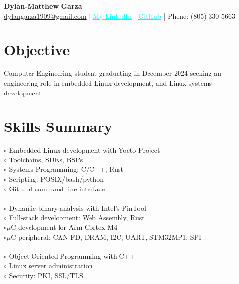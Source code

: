 \documentclass[letter,12pt]{article}
\begin{document}
\begin{center}
\textbf{\LARGE Dylan-Matthew Garza} \\[0.1cm]
\href{mailto:dylangarza1909@gmail.com}{dylangarza1909@gmail.com} |
  \href{https://www.linkedin.com/in/dylan-matthew-garza-094b021ba/}{\textcolor{cyan}{\underline{My LinkedIn}}} |
  \href{https://github.com/DMGDy}{\textcolor{cyan}{\underline{GitHub}}} |
Phone: (805) 330-5663
\end{center}

\vspace{-1.5cm}
\section*{Objective}
Computer Engineering student graduating in December 2024 seeking an 
engineering role in embedded Linux development, and Linux systems 
development.

\vspace{-.5cm}
\section*{Skills Summary}
\vspace{-.5cm}
\begin{tcolorbox}
  [colback=gray!25,
  leftrule=0pt,
  rightrule=0pt,
  sharp corners]
\vspace{-.125cm}
  \begin{multicols}{3}
  $\circ$ Embedded Linux development with Yocto Project\\
  $\circ$ Toolchains, SDKs, BSPs \\
  $\circ$ Systems Programming: C/C++, Rust \\
  $\circ$ Scripting: POSIX/bash/python \\
  $\circ$ Git and command line interface \\
  \columnbreak\\
  $\circ$ Dynamic binary analysis with Intel's PinTool\\
  $\circ$ Full-stack development: Web Assembly, Rust\\
  $\circ$$\mu$C development for Arm Cortex-M4\\
  $\circ$$\mu$C peripheral: CAN-FD, DRAM, I2C, UART, STM32MP1, SPI\\
  \columnbreak\\
  $\circ$ Object-Oriented Programming with C++ \\
  $\circ$ Linux server administration \\
  $\circ$ Security: PKI, SSL/TLS\\
  \end{multicols}
    
\vspace{-1.00cm}
\end{tcolorbox}
\end{document}
